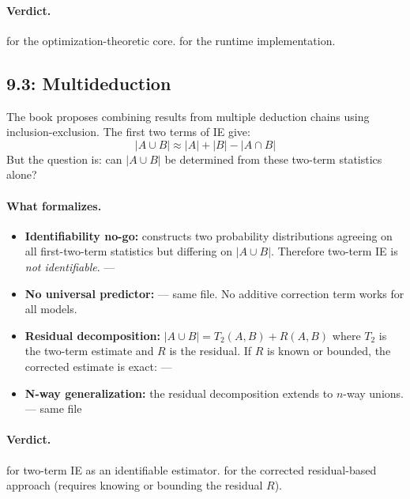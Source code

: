 \documentclass[11pt,openany]{report}
\begin{document}
\paragraph{Verdict.}
\verdictClean{} for the optimization-theoretic core.
\verdictHeuristic{} for the runtime implementation.

\subsection{9.3: Multideduction}

The book proposes combining results from multiple deduction chains using
inclusion-exclusion.  The first two terms of IE give:
\[
  |A \cup B| \approx |A| + |B| - |A \cap B|
\]
But the question is: can $|A \cup B|$ be determined from these two-term
statistics alone?

\paragraph{What formalizes.}
\begin{itemize}
\item \textbf{Identifiability no-go:}
   constructs two
  probability distributions agreeing on all first-two-term statistics
  but differing on $|A \cup B|$.  Therefore two-term IE is
  \emph{not identifiable}. ---
\item \textbf{No universal predictor:}
   ---
  same file.  No additive correction term works for all models.
\item \textbf{Residual decomposition:}
  $|A \cup B| = T_2(A,B) + R(A,B)$ where $T_2$ is the two-term estimate
  and $R$ is the residual.  If $R$ is known or bounded, the corrected
  estimate is exact:
   ---
\item \textbf{N-way generalization:} the residual decomposition extends
  to $n$-way unions. ---  same file
\end{itemize}

\paragraph{Verdict.}
\verdictNoGo{} for two-term IE as an identifiable estimator.
\verdictAssumption{} for the corrected residual-based approach (requires
knowing or bounding the residual $R$).
\end{document}
